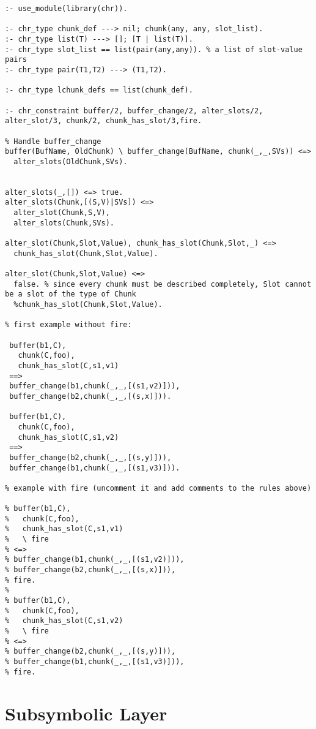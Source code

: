 \begin{lstlisting}[caption={Rule order example}]
:- use_module(library(chr)).

:- chr_type chunk_def ---> nil; chunk(any, any, slot_list).
:- chr_type list(T) ---> []; [T | list(T)].
:- chr_type slot_list == list(pair(any,any)). % a list of slot-value pairs
:- chr_type pair(T1,T2) ---> (T1,T2).

:- chr_type lchunk_defs == list(chunk_def).

:- chr_constraint buffer/2, buffer_change/2, alter_slots/2, alter_slot/3, chunk/2, chunk_has_slot/3,fire.

% Handle buffer_change
buffer(BufName, OldChunk) \ buffer_change(BufName, chunk(_,_,SVs)) <=>
  alter_slots(OldChunk,SVs).

  
alter_slots(_,[]) <=> true.
alter_slots(Chunk,[(S,V)|SVs]) <=> 
  alter_slot(Chunk,S,V),
  alter_slots(Chunk,SVs).
  
alter_slot(Chunk,Slot,Value), chunk_has_slot(Chunk,Slot,_) <=>
  chunk_has_slot(Chunk,Slot,Value).
  
alter_slot(Chunk,Slot,Value) <=>
  false. % since every chunk must be described completely, Slot cannot be a slot of the type of Chunk
  %chunk_has_slot(Chunk,Slot,Value).  

% first example without fire: 
  
 buffer(b1,C),
   chunk(C,foo),
   chunk_has_slot(C,s1,v1)
 ==>
 buffer_change(b1,chunk(_,_,[(s1,v2)])),
 buffer_change(b2,chunk(_,_,[(s,x)])).
 
 buffer(b1,C),
   chunk(C,foo),
   chunk_has_slot(C,s1,v2)
 ==>
 buffer_change(b2,chunk(_,_,[(s,y)])),
 buffer_change(b1,chunk(_,_,[(s1,v3)])).

% example with fire (uncomment it and add comments to the rules above) 
 
% buffer(b1,C),
%   chunk(C,foo),
%   chunk_has_slot(C,s1,v1)
%   \ fire
% <=>
% buffer_change(b1,chunk(_,_,[(s1,v2)])),
% buffer_change(b2,chunk(_,_,[(s,x)])),
% fire.
% 
% buffer(b1,C),
%   chunk(C,foo),
%   chunk_has_slot(C,s1,v2)
%   \ fire
% <=>
% buffer_change(b2,chunk(_,_,[(s,y)])),
% buffer_change(b1,chunk(_,_,[(s1,v3)])),
% fire.
\end{lstlisting}

\flushbottom

\section{Subsymbolic Layer}
\label{app:ex:subsymbolic_layer}

